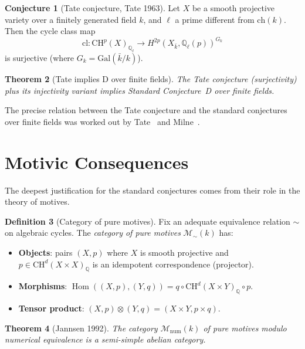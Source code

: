 \documentclass[12pt,a4paper]{amsart}
\newtheorem{theorem}{Theorem}[section]
\theoremstyle{definition}
\newtheorem{definition}[theorem]{Definition}
\newtheorem{conjecture}[theorem]{Conjecture}
\newcommand{\Q}{\mathbb{Q}}
\DeclareMathOperator{\Hom}{Hom}
\newcommand{\Gal}{\mathrm{Gal}}
\newcommand{\ch}{\mathrm{ch}}
\newcommand{\CH}{\mathrm{CH}}
\newcommand{\cl}{\mathrm{cl}}
\begin{document}
\begin{conjecture}[Tate conjecture, Tate 1963]
Let $X$ be a smooth projective variety over a finitely generated field $k$,
and $\ell$ a prime different from $\ch(k)$.  Then the cycle class map
\[
  \cl: \CH^p(X)_{\Q_\ell} \to H^{2p}(X_{\bar k}, \Q_\ell(p))^{G_k}
\]
is surjective (where $G_k = \Gal(\bar k/k)$).
\end{conjecture}

\begin{theorem}[Tate implies D over finite fields]
The Tate conjecture (surjectivity) plus its injectivity variant implies
Standard Conjecture~D over finite fields.
\end{theorem}

The precise relation between the Tate conjecture and the standard conjectures
over finite fields was worked out by Tate~\cite{tate1994} and Milne~\cite{milne2002}.

\section{Motivic Consequences}\label{sec:motives}

The deepest justification for the standard conjectures comes from their role
in the theory of motives.

\begin{definition}[Category of pure motives]
Fix an adequate equivalence relation $\sim$ on algebraic cycles.  The
\emph{category of pure motives} $\mathcal{M}_\sim(k)$ has:
\begin{itemize}
  \item \textbf{Objects}: pairs $(X, p)$ where $X$ is smooth projective and
        $p \in \CH^d(X \times X)_\Q$ is an idempotent correspondence (projector).
  \item \textbf{Morphisms}: $\Hom((X,p),(Y,q)) = q \circ \CH^d(X \times Y)_\Q \circ p$.
  \item \textbf{Tensor product}: $(X,p) \otimes (Y,q) = (X \times Y, p \times q)$.
\end{itemize}
\end{definition}

\begin{theorem}[Jannsen 1992]\label{thm:jannsen}
The category $\mathcal{M}_{\mathrm{num}}(k)$ of pure motives modulo numerical
equivalence is a \emph{semi-simple abelian category}.
\end{theorem}
\end{document}
